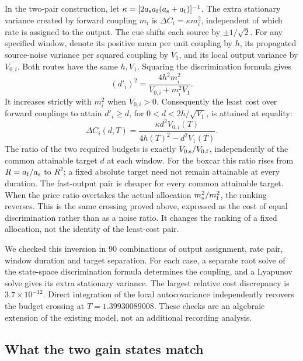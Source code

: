 \documentclass[aps,10pt,onecolumn,superscriptaddress,nofootinbib,
  longbibliography,amsmath,amssymb,floatfix]{revtex4-2}
\begin{document}
In the two-pair construction, let
\(\kappa=[2a_{\rm s}a_{\rm f}(a_{\rm s}+a_{\rm f})]^{-1}\).
The extra stationary variance created by forward coupling
\(m_i\) is \(\Delta C_i=\kappa m_i^2\), independent of which
rate is assigned to the output. The cue shifts each source
by \(\pm1/\sqrt 2\). For any specified window, denote its
positive mean per unit coupling by \(h\), its propagated
source-noise variance per squared coupling by \(V_1\), and
its local output variance by \(V_{0,i}\). Both routes have
the same \(h,V_1\). Squaring the discrimination formula gives
\[
 (d'_i)^2=\frac{4h^2m_i^2}{V_{0,i}+m_i^2V_1}.
\]
It increases strictly with \(m_i^2\) when \(V_{0,i}>0\).
Consequently the least cost over forward couplings to attain
\(d'_i\ge d\), for \(0<d<2h/\sqrt{V_1}\), is attained at equality:
\begin{equation}
 \Delta C_i(d,T)=
 \frac{\kappa d^2 V_{0,i}(T)}{4h(T)^2-d^2 V_1(T)}.
 \label{eq:readoutcost}
\end{equation}
The ratio of the two required budgets is exactly
\(V_{0,\rm s}/V_{0,\rm f}\), independently of the common
attainable target \(d\) at each window. For the boxcar this ratio
rises from \(R=a_{\rm f}/a_{\rm s}\) to \(R^2\); a fixed
absolute target need not remain attainable at every duration.
The fast-output pair is cheaper for every common attainable
target. When the price ratio overtakes the
actual allocation \(m_{\rm s}^2/m_{\rm f}^2\), the ranking
reverses. This is the same crossing proved above, expressed
as the cost of equal discrimination rather than as a noise ratio.
It changes the ranking of a fixed allocation, not the identity
of the least-cost pair.

We checked this inversion in 90 combinations of output
assignment, rate pair, window duration and target separation.
For each case, a separate root solve of the state-space
discrimination formula determines the coupling, and a Lyapunov
solve gives its extra stationary variance. The largest relative
cost discrepancy is \(3.7\times10^{-12}\). Direct integration
of the local autocovariance independently recovers the budget
crossing at \(T=1.39930089008\). These checks are an algebraic
extension of the existing model, not an additional recording
analysis.

\subsection{What the two gain states match}
\end{document}
